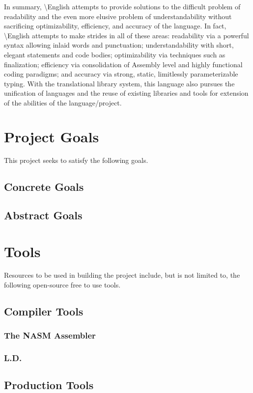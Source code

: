 \documentclass{article}
\newcommand{\name}{\textbackslash{}English}
\begin{document}
\indent In summary, \name{} attempts to provide solutions to the difficult problem of readability and the even more elusive problem of understandability without sacrificing optimizability, efficiency, and accuracy of the language. In fact, \name{} attempts to make strides in all of these areas: readability via a powerful syntax allowing inlaid words and punctuation; understandability with short, elegant statements and code bodies; optimizability via techniques such as finalization; efficiency via consolidation of Assembly level and highly functional coding paradigms; and accuracy via strong, static, limitlessly parameterizable typing. With the translational library system, this language also pursues the unification of languages and the reuse of existing libraries and tools for extension of the abilities of the language/project.

\section{Project Goals}
\indent This project seeks to satisfy the following goals.
\subsection{Concrete Goals}
\subsection{Abstract Goals}

\section{Tools}
\indent Resources to be used in building the project include, but is not limited to, the following open-source free to use tools.
\subsection{Compiler Tools}
\subsubsection{The NASM Assembler}
\subsubsection{L.D.}
\subsection{Production Tools}
\end{document}
